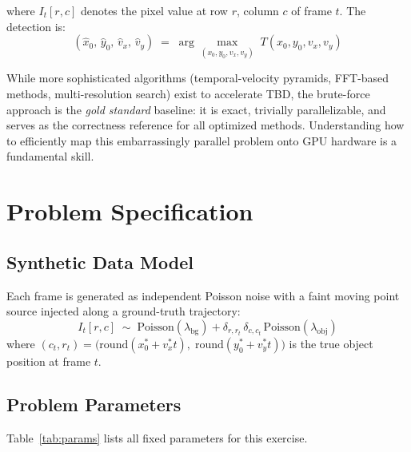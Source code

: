 \documentclass[11pt,letterpaper]{article}
\begin{document}
\noindent where $I_t[r, c]$ denotes the pixel value at row $r$, column $c$
of frame $t$. The detection is:
\begin{equation}
    (\hat{x}_0,\, \hat{y}_0,\, \hat{v}_x,\, \hat{v}_y)
    \;=\;
    \arg\max_{(x_0, y_0, v_x, v_y)} \; T(x_0, y_0, v_x, v_y)
    \label{eq:detection}
\end{equation}

\begin{notebox}
While more sophisticated algorithms (temporal-velocity pyramids, FFT-based
methods, multi-resolution search) exist to accelerate TBD, the brute-force
approach is the \emph{gold standard} baseline: it is exact, trivially
parallelizable, and serves as the correctness reference for all optimized
methods. Understanding how to efficiently map this embarrassingly parallel
problem onto GPU hardware is a fundamental skill.
\end{notebox}

\section{Problem Specification}
\label{sec:problem}

\subsection{Synthetic Data Model}

Each frame is generated as independent Poisson noise with a faint moving
point source injected along a ground-truth trajectory:
\begin{equation}
    I_t[r, c] \;\sim\;
    \mathrm{Poisson}\!\left(\lambda_{\mathrm{bg}}\right)
    + \delta_{r, r_t}\,\delta_{c, c_t}\,
      \mathrm{Poisson}\!\left(\lambda_{\mathrm{obj}}\right)
    \label{eq:data_model}
\end{equation}
where $(c_t, r_t) = \bigl(\mathrm{round}(x_0^* + v_x^* t),\;
\mathrm{round}(y_0^* + v_y^* t)\bigr)$ is the true object position at frame $t$.

\subsection{Problem Parameters}

Table~\ref{tab:params} lists all fixed parameters for this exercise.
\end{document}
